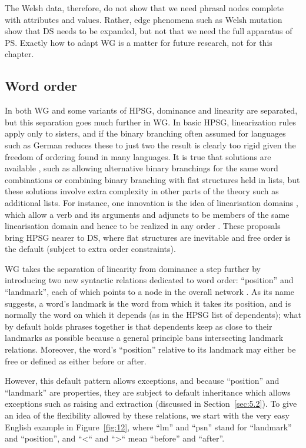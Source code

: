 \documentclass[output=paper]{langscibook}
\begin{document}
The Welsh data, therefore, do not show that we need phrasal nodes complete with attributes and values. Rather, edge phenomena such as Welsh mutation show that DS needs to be expanded, but not that we need the full apparatus of PS. Exactly how to adapt WG is a matter for future research, not for this chapter.


\subsection{Word order}
\label{sec:4.4}

In both WG and some variants of HPSG, dominance and linearity are separated, but this separation goes much further in WG. In basic HPSG, linearization rules apply only to sisters, and if the binary branching often assumed for languages such as German \citep[Section~10.3]{MuellerGT-Eng2} reduces these to just two the result is clearly too rigid given the freedom of ordering found in many languages. It is true that solutions are available \citep[Chapter~10]{MuellerGT-Eng2}, such as allowing alternative binary branchings for the same word combinations or combining binary branching with flat structures held in lists, but these solutions involve extra complexity in other parts of the theory such as additional lists. For instance, one innovation is the idea of linearisation domains \citep{Reape94a,Kathol2000a,Babel}, which allow a verb and its arguments and adjuncts to be members of the same linearisation domain and hence to be realized in any order \citep[302]{MuellerGT-Eng2}. These proposals bring HPSG nearer to DS, where flat structures are inevitable and free order is the default (subject to extra order constraints).

WG takes the separation of linearity from dominance a step further by introducing two new syntactic relations dedicated to word order: ``position'' and ``landmark'', each of which points to a node in the overall network \citep{Hudson2017a}. As its name suggests, a word’s landmark is the word from which it takes its position, and is normally the word on which it depends (as in the HPSG list of dependents); what by default holds phrases together is that dependents keep as close to their landmarks as possible because a general principle bans intersecting landmark relations. Moreover, the word’s ``position'' relative to its landmark may either be free or defined as either before or after.

However, this default pattern allows exceptions, and because ``position'' and ``landmark'' are properties, they are subject to default inheritance which allows exceptions such as raising and extraction (discussed in Section~\ref{sec:5.2}). To give an idea of the flexibility allowed by these relations, we start with the very easy English example in Figure~\ref{fig:12}, where ``lm'' and ``psn'' stand for ``landmark'' and ``position'', and ``<`` and ``>`` mean ``before'' and ``after''.
\end{document}

